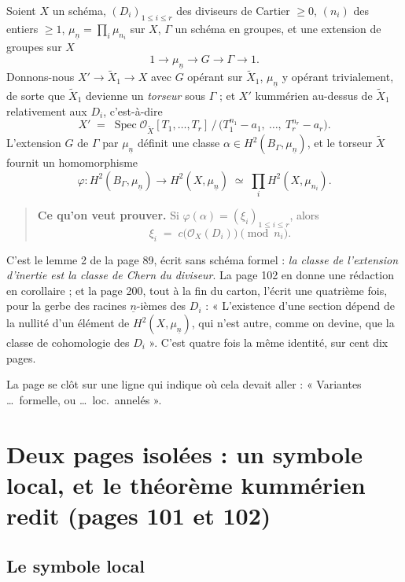 \documentclass[11pt,a4paper]{article}
\begin{document}
Soient $X$ un schéma, $(D_{i})_{1 \leqslant i \leqslant r}$ des diviseurs de
Cartier $\geqslant 0$, $(n_{i})$ des entiers $\geqslant 1$,
$\mu_{\underline{n}} = \prod_{i} \mu_{n_{i}}$ sur $X$, $\Gamma$ un schéma en
groupes, et une extension de groupes sur $X$
\[
  1 \longrightarrow \mu_{\underline{n}} \longrightarrow G \longrightarrow
  \Gamma \longrightarrow 1 .
\]
Donnons-nous $X' \to \tilde{X}_{1} \to X$ avec $G$ opérant sur $\tilde{X}_{1}$,
$\mu_{\underline{n}}$ y opérant trivialement, de sorte que $\tilde{X}_{1}$
devienne un \emph{torseur} sous $\Gamma$ ; et $X'$ kummérien au-dessus de
$\tilde{X}_{1}$ relativement aux $D_{i}$, c'est-à-dire
\[
  X' \;=\; \operatorname{Spec}
  \mathcal{O}_{\tilde{X}}[T_{1}, \dots, T_{r}]\,\big/\,
  \bigl(T_{1}^{n_{1}} - a_{1},\ \dots,\ T_{r}^{n_{r}} - a_{r}\bigr) .
\]
L'extension $G$ de $\Gamma$ par $\mu_{\underline{n}}$ définit une classe
$\alpha \in H^{2}(B_{\Gamma}, \mu_{\underline{n}})$, et le torseur
$\tilde{X}$ fournit un homomorphisme
\[
  \varphi : H^{2}(B_{\Gamma}, \mu_{\underline{n}}) \longrightarrow
  H^{2}(X, \mu_{\underline{n}}) \;\simeq\;
  \prod_{i} H^{2}(X, \mu_{n_{i}}) .
\]

\begin{quote}
\textbf{Ce qu'on veut prouver.} Si $\varphi(\alpha) = (\xi_{i})_{1 \leqslant i
\leqslant r}$, alors
\[
  \xi_{i} \;=\; c\bigl(\mathcal{O}_{X}(D_{i})\bigr) \pmod{n_{i}} .
\]
\end{quote}

C'est le lemme 2 de la page 89, écrit sans schéma formel : \emph{la classe de
l'extension d'inertie est la classe de Chern du diviseur}. La page 102 en donne une rédaction en corollaire ; et la page 200, tout à la fin du
carton, l'écrit une quatrième fois, pour la gerbe des racines
$\underline{n}$-ièmes des $D_{i}$ : « L'existence d'une section dépend de la
nullité d'un élément de $H^{2}(X, \mu_{\underline{n}})$, qui n'est autre,
comme on devine, que la classe de cohomologie des $D_{i}$ ». C'est quatre fois
la même identité, sur cent dix pages.

La page se clôt sur une ligne qui indique où cela devait aller : « Variantes
…\ formelle, ou …\ loc.\ annelés ».

\section*{Deux pages isolées : un symbole local, et le théorème kummérien redit (pages 101 et 102)}

\subsection*{Le symbole local}
\end{document}
